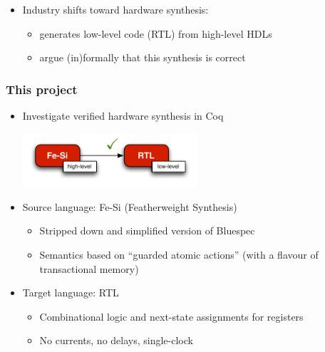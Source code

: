 \documentclass[9pt]{beamer}
\newcommand\fesi{Fe-Si}
\begin{document}
\begin{frame}
\begin{itemize}
    \pause
    
  \item Industry shifts toward \alert{hardware synthesis}: 
    \begin{itemize}
    \item generates low-level code (RTL) from high-level HDLs
    \item argue (in)formally that this synthesis is correct
    \end{itemize}
  \end{itemize}
\end{frame}

\begin{frame}
  \frametitle{This project}
  \begin{itemize}
  \item  Investigate verified hardware synthesis in Coq
    
    \begin{center}
      \includegraphics[height= 2cm ]{figs/compilation.pdf}
    \end{center}
    \pause
    
  \item Source language: \alert{\fesi{}} (Featherweight Synthesis)
    \begin{itemize}
    \item Stripped down and simplified version of \alert{Bluespec} 
    \item Semantics based on ``guarded atomic actions'' (with a flavour of transactional memory)
    \end{itemize}
    
    \pause
    
  \item Target language: RTL
    \begin{itemize}
    \item Combinational logic and next-state assignments for registers
    \item No currents, no delays, single-clock
    \end{itemize}
  \end{itemize}
\end{frame}
\end{document}
